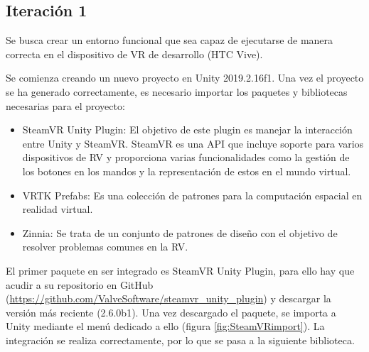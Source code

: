 
\subsection{Iteración 1}

Se busca crear un entorno funcional que sea capaz de ejecutarse de manera correcta en el dispositivo de VR de desarrollo (HTC Vive).

Se comienza creando un nuevo proyecto en Unity 2019.2.16f1. Una vez el proyecto se ha generado correctamente, es necesario importar los paquetes y bibliotecas necesarias para el proyecto:


\begin{itemize}
	\item{SteamVR Unity Plugin: El objetivo de este plugin es manejar la interacción entre Unity y SteamVR. SteamVR es una API que incluye soporte para varios dispositivos de RV y proporciona varias funcionalidades como la gestión de los botones en los mandos y la representación de estos en el mundo virtual.}

	\item{VRTK Prefabs: Es una colección de patrones para la computación espacial en realidad virtual.}
	
	\item{Zinnia: Se trata de un conjunto de patrones de diseño con el objetivo de resolver problemas comunes en la RV.}

\end{itemize}

El primer paquete en ser integrado es SteamVR Unity Plugin, para ello hay que acudir a su repositorio en GitHub (\url{https://github.com/ValveSoftware/steamvr\_unity\_plugin}) y descargar la versión más reciente (2.6.0b1). Una vez descargado el paquete, se importa a Unity mediante el menú dedicado a ello (figura \ref{fig:SteamVRimport}). La integración se realiza correctamente, por lo que se pasa a la siguiente biblioteca.


